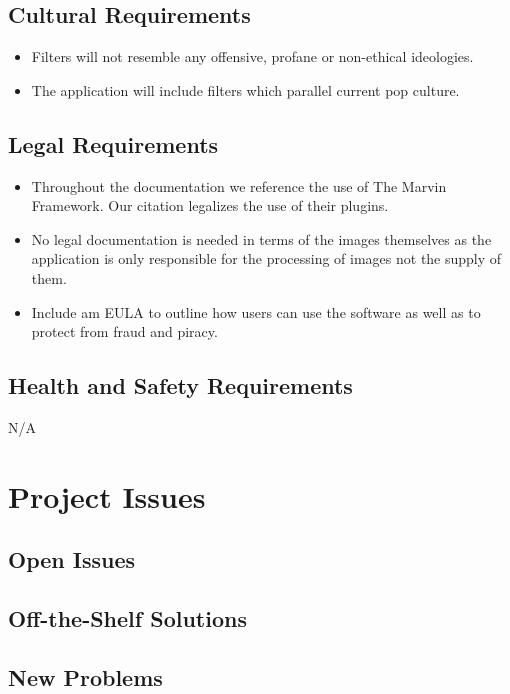 \documentclass[12pt, titlepage]{article}
\begin{document}
\subsection{Cultural Requirements}
\begin{itemize}
\item Filters will not resemble any offensive, profane or non-ethical ideologies.
\item The application will include filters which parallel current pop culture.
\end{itemize}

\subsection{Legal Requirements}
\begin{itemize}
\item Throughout the documentation we reference the use of The Marvin Framework. Our citation legalizes the use of their plugins.
\item No legal documentation is needed in terms of the images themselves as the application is only responsible for the processing of images not the supply of them.
\item Include am EULA to outline how users can use the software as well as to protect from fraud and piracy.
\end{itemize}

\subsection{Health and Safety Requirements}
N/A

\section{Project Issues}

\subsection{Open Issues}

\subsection{Off-the-Shelf Solutions}

\subsection{New Problems}
\end{document}
